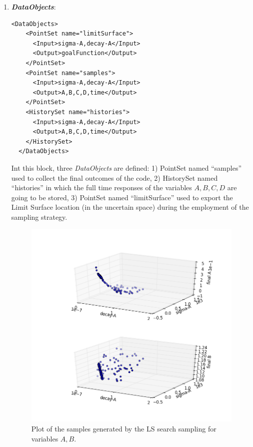 \begin{enumerate}
   \item \textbf{\textit{DataObjects}}:
\begin{lstlisting}[style=XML,morekeywords={arg,extension,pauseAtEnd,overwrite}]
  <DataObjects>
    <PointSet name="limitSurface">
      <Input>sigma-A,decay-A</Input>
      <Output>goalFunction</Output>
    </PointSet>
    <PointSet name="samples">
      <Input>sigma-A,decay-A</Input>
      <Output>A,B,C,D,time</Output>
    </PointSet>
    <HistorySet name="histories">
      <Input>sigma-A,decay-A</Input>
      <Output>A,B,C,D,time</Output>
    </HistorySet>
  </DataObjects>
\end{lstlisting}
  Int this block, three \textit{DataObjects} are defined: 1) PointSet 
  named ``samples'' used to collect the final outcomes of the code, 2) 
  HistorySet named ``histories'' in which the full time responses of the 
  variables $A,B,C,D$ are going to be stored, 3) PointSet named    
  ``limitSurface'' used  to export the Limit Surface location (in the uncertain space) during the employment of the sampling strategy.
 \begin{figure}[h!]
  \centering
  \includegraphics[scale=0.7]{pics/LS_pointsets.png}
  \caption{Plot of the samples generated by the LS search sampling for variables $A,B$.}

\end{figure}
\end{enumerate}

